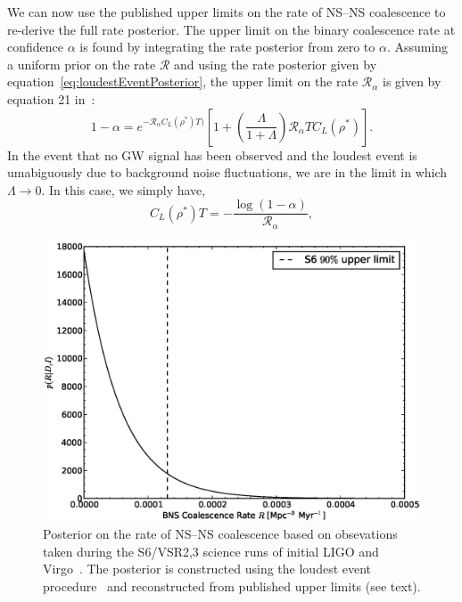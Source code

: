 \documentclass[twocolumn,nofootinbib]{revtex4-1}
\newcommand{\cbcrate}{{{\mathcal R}}}
\newcommand{\rhostar}{{\rho^*}}
\newcommand{\BNS}{\ac{NS}--\ac{NS}\xspace}
\begin{document}
We can now use the published upper limits on the rate of \BNS coalescence to re-derive the full rate posterior.
The upper limit on the binary coalescence rate at confidence $\alpha$ is found by integrating the rate posterior from zero to $\alpha$.
Assuming a uniform prior on the rate $\cbcrate$ and using the rate posterior given by equation~\ref{eq:loudestEventPosterior}, the upper limit on the rate $\cbcrate_{\alpha}$ is given by equation 21 in~\cite{BradyFairhurst08}:
%
\begin{equation}
1-\alpha =  e^{-\cbcrate_{\alpha} C_L(\rhostar)T)}
\left[ 
1+ \left(\frac{\Lambda}{1+\Lambda}\right) \cbcrate_{\alpha} T C_L(\rhostar)
\right ].
\label{eq:rateIntegral}
\end{equation}
%
In the event that no \ac{GW} signal has been observed and the loudest event is umabiguously due to background noise fluctuations, we are in the limit in which $\Lambda \rightarrow 0$.
In this case, we simply have,
\begin{equation}
C_L(\rhostar)T = -\frac{\log(1-\alpha)}{\cbcrate_{\alpha}},
\end{equation}
%
%

\begin{figure}
\centering
\includegraphics[width=\linewidth]{S6_rate.eps}
\caption{Posterior on the rate of \BNS coalescence based on obsevations taken during the S6/VSR2,3 science runs of initial LIGO and Virgo~\cite{Colaboration:2011np}.
    The posterior is constructed using the loudest event procedure~\cite{Biswas09,BradyFairhurst08} and reconstructed from published upper limits (see text).
    \label{fig:s6rate}}
\end{figure}
\end{document}
